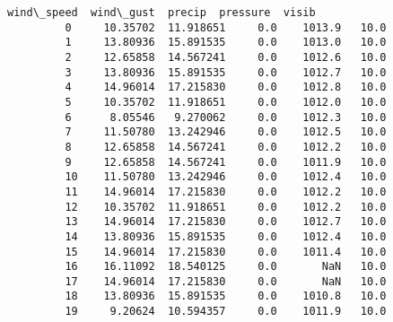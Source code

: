 \documentclass[11pt]{article}
\begin{document}
\begin{Verbatim}[commandchars=\\\{\}]
             wind\_speed  wind\_gust  precip  pressure  visib  
         0     10.35702  11.918651     0.0    1013.9   10.0  
         1     13.80936  15.891535     0.0    1013.0   10.0  
         2     12.65858  14.567241     0.0    1012.6   10.0  
         3     13.80936  15.891535     0.0    1012.7   10.0  
         4     14.96014  17.215830     0.0    1012.8   10.0  
         5     10.35702  11.918651     0.0    1012.0   10.0  
         6      8.05546   9.270062     0.0    1012.3   10.0  
         7     11.50780  13.242946     0.0    1012.5   10.0  
         8     12.65858  14.567241     0.0    1012.2   10.0  
         9     12.65858  14.567241     0.0    1011.9   10.0  
         10    11.50780  13.242946     0.0    1012.4   10.0  
         11    14.96014  17.215830     0.0    1012.2   10.0  
         12    10.35702  11.918651     0.0    1012.2   10.0  
         13    14.96014  17.215830     0.0    1012.7   10.0  
         14    13.80936  15.891535     0.0    1012.4   10.0  
         15    14.96014  17.215830     0.0    1011.4   10.0  
         16    16.11092  18.540125     0.0       NaN   10.0  
         17    14.96014  17.215830     0.0       NaN   10.0  
         18    13.80936  15.891535     0.0    1010.8   10.0  
         19     9.20624  10.594357     0.0    1011.9   10.0  
\end{Verbatim}
            
\end{document}

